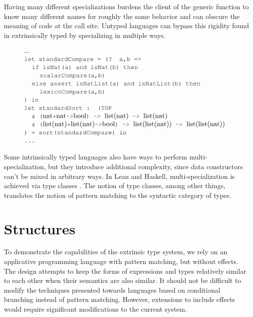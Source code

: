 \documentclass[acmsmall]{acmart}
\theoremstyle{definition}
\begin{document}
\noindent
Having many different specializations burdens the client of
the generic function to know many different names for roughly the same behavior and can obscure the meaning
of code at the call site. 
Untyped languages can bypass this rigidity found in extrinsically typed by specializing in multiple ways.

\[
  \begin{array}[t]{@{} l}
    ...
    \\
    \J{let standardCompare = (? a,b =>} 
    \\
    \I \J{if isNat(a) and isNat(b) then} 
    \\
    \I\I \J{scalarCompare(a,b)}
    \\
    \I \J{else assert isNatList(a) and isNatList(b) then} 
    \\
    \I\I \J{lexicoCompare(a,b)}
    \\
    \J{) in} 
    \\
    \J{let standardSort : (TOP}
    \\
    \I \J{\& (}\text{nat}\J{*}\text{nat}\J{->}\text{bool} \J{) -> }\text{list}(\text{nat}) \J{ -> } \text{list}(\text{nat})
    \\
    \I \J{\& (}\text{list}(\text{nat})\J{*}\text{list}(\text{nat})\J{->}\text{bool} \J{) -> }\text{list}(\text{list}(\text{nat})) \J{ -> } \text{list}(\text{list}(\text{nat}))
    \\
    \J{) = sort(standardCompare) in}
    \\
    \J{...} 
  \end{array}
\]

\noindent
Some intrinsically typed languages also have ways to perform multi-specialization, but they introduce additional
complexity, since data constructors can't be mixed in arbitrary ways. In Lean and Haskell, multi-specialization
is achieved via type classes \cite{}. 
The notion of type classes, among other things, translates the notion of pattern matching to the syntactic category of types.

\section{Structures}
\label{sec:structures}
To demonstrate the capabilities of the extrinsic type system, we rely on an applicative
programming language with pattern matching, but without effects.
The design attempts to keep the forms of expressions and types relatively 
similar to each other when their semantics are also similar. 
It should not be difficult to modify the techniques presented towards
languages based on conditional branching instead of pattern matching. However,
extensions to include effects would require 
significant modifications to the current system.
\end{document}
